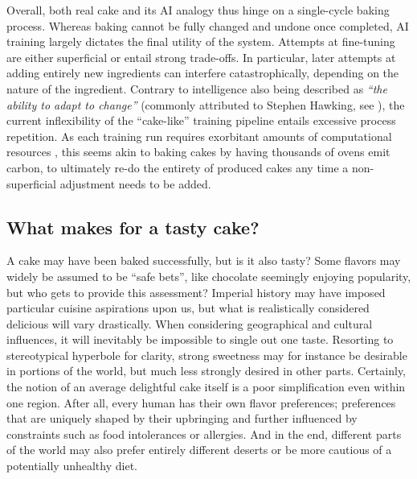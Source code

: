 \documentclass[manuscript,screen,authorversion,nonacm]{acmart}
\begin{document}
Overall, both real cake and its AI analogy thus hinge on a single-cycle baking process. Whereas baking cannot be fully changed and undone once completed, AI training largely dictates the final utility of the system. Attempts at fine-tuning are either superficial or entail strong trade-offs. In particular, later attempts at adding entirely new ingredients can interfere catastrophically, depending on the nature of the ingredient. Contrary to intelligence also being described as \emph{``the ability to adapt to change''} (commonly attributed to Stephen Hawking, see \citet{Strauss2018hawking}), the current inflexibility of the ``cake-like'' training pipeline entails excessive process repetition. As each training run requires exorbitant amounts of computational resources \cite{Ludvigsen2023GPT4CO2,Patterson2021LargeScaleCarbon}, this seems akin to baking cakes by having thousands of ovens emit carbon, to ultimately re-do the entirety of produced cakes any time a non-superficial adjustment needs to be added.

\subsection{What makes for a tasty cake?}
A cake may have been baked successfully, but is it also tasty? Some flavors may widely be assumed to be ``safe bets'', like chocolate seemingly enjoying popularity, but who gets to provide this assessment? 
Imperial history may have imposed particular cuisine aspirations upon us, but what is realistically considered delicious will vary drastically. When considering geographical and cultural influences, it will inevitably be impossible to single out one taste.
Resorting to stereotypical hyperbole for clarity, strong sweetness may for instance be desirable in portions of the world, but much less strongly desired in other parts. Certainly, the notion of an average delightful cake itself is a poor simplification even within one region. 
After all, every human has their own flavor preferences; preferences that are uniquely shaped by their upbringing and further influenced by constraints such as food intolerances or allergies. And in the end, different parts of the world may also prefer entirely different deserts or be more cautious of a potentially unhealthy diet. 
\end{document}
